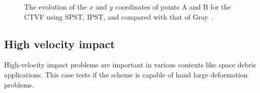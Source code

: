 \documentclass[preprint,12pt]{elsarticle}
\begin{document}
\begin{figure}[!htpb]
\begin{subfigure}{0.48\textwidth}
    \label{fig:rings-compare-y}
  \end{subfigure}
  \caption{The evolution of the $x$ and $y$ coordinates of points A and B for
    the CTVF using SPST, IPST, and compared with that of
    Gray~\cite{gray-ed-2001}.}
\label{fig:rings_compare}
\end{figure}


\FloatBarrier%
\subsection{High velocity impact}

High-velocity impact problems are important in various contexts like space
debris applications. This case tests if the scheme is capable of hand large
deformation problems.
\end{document}
